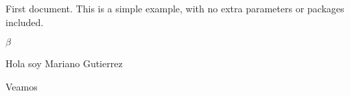 \documentclass{article}
\begin{document}
First document. This is a simple example, with no 
extra parameters or packages included.

\(\beta\)

Hola soy Mariano Gutierrez 

Veamos
\end{document}
